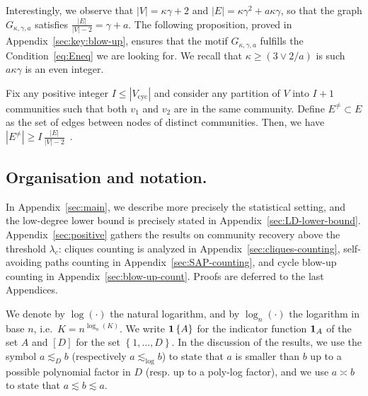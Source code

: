 \documentclass[final]{colt2026}
\newcommand{\1}{\mathbf{1}}
\newcommand{\ac}[1]{\left\{#1\right\}}
\begin{document}
\vspace{-0.3cm}




Interestingly, we observe that $|V| = \kappa \gamma + 2$ and $|E| = \kappa \gamma^2 + a \kappa \gamma$,
so that the graph $G_{\kappa,\gamma, a}$ satisfies
$\frac{|E|}{|V|-2}= \gamma + a$. 
The following proposition, proved in Appendix~\ref{sec:key:blow-up}, ensures that the motif $G_{\kappa,\gamma,a}$ fulfills the Condition~\eqref{eq:Eneq} we are looking for. We recall that  $\kappa\geq (3\vee 2/a)$ is such $a \kappa\gamma$ is an even integer.

\begin{proposition}\label{prop:key:blow-up}
Fix any positive integer $I\leq |V_{\mathrm{cyc}}|$ and consider any partition of $V$ into $I+1$ communities such that both $v_1$ and $v_2$ are in the same community. Define $E^{\neq}\subset E$ as the set of edges between nodes of distinct communities. Then, we have
${|E^{\neq}|\ge I\, \frac{|E|}{|V|-2}}\enspace .$
\end{proposition}





\subsection{Organisation and notation.}
In Appendix~\ref{sec:main}, we describe more precisely the statistical setting, and the low-degree lower bound is precisely stated in Appendix~\ref{sec:LD-lower-bound}. Appendix~\ref{sec:positive} gathers the results on community recovery above the threshold $\lambda_{c}$:  cliques counting is analyzed in Appendix~\ref{sec:cliques-counting},  self-avoiding paths counting in Appendix~\ref{sec:SAP-counting}, and cycle blow-up counting in Appendix~\ref{sec:blow-up-count}. 
Proofs are deferred to the last Appendices.

We denote by $\log(\cdot)$ the natural logarithm, and by $\log_{n}(\cdot)$ the logarithm in base $n$, i.e.\ $K=n^{\log_{n}(K)}$.
We write ${\bf 1}\ac{A}$ for the indicator function ${\bf 1}_{A}$ of the set $A$
and
$[D]$ for the set $\ac{1,\ldots,D}$. 
In the discussion of the results, we use the symbol $a\lesssim_{D} b$ (respectively $a\lesssim_{\log} b$) to state that $a$ is smaller than $b$ up to a possible polynomial factor in $D$ (resp. up to a poly-log factor), and we use $a\asymp b$ to state that $a\lesssim b \lesssim a$. 
\end{document}
